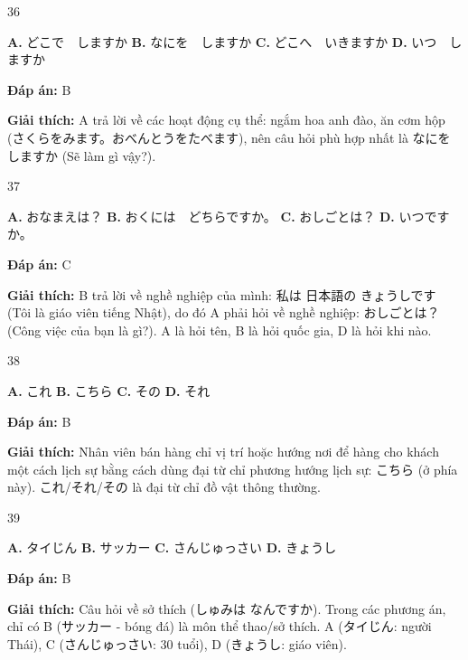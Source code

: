 \documentclass[12pt,a4paper]{report}
\newcommand{\source}[1]{}
\newcommand{\choice}[2]{\textbf{#1.} #2 \quad}
\newcommand{\answer}[1]{\par\textbf{Đáp án:} #1}
\newcommand{\confidence}[1]{}
\newcommand{\explain}[1]{\par\textbf{Giải thích:} #1\vspace{0.5cm}}
\begin{document}
\begin{question}{36}
\source{Q14.jpg}
\choice{A}{どこで　しますか}
\choice{B}{なにを　しますか}
\choice{C}{どこへ　いきますか}
\choice{D}{いつ　しますか}
\answer{B}
\confidence{high}
\explain{A trả lời về các hoạt động cụ thể: ngắm hoa anh đào, ăn cơm hộp (さくらをみます。おべんとうをたべます), nên câu hỏi phù hợp nhất là なにを しますか (Sẽ làm gì vậy?).}
\end{question}

\begin{question}{37}
\source{Q17.jpg}
\choice{A}{おなまえは？}
\choice{B}{おくには　どちらですか。}
\choice{C}{おしごとは？}
\choice{D}{いつですか。}
\answer{C}
\confidence{high}
\explain{B trả lời về nghề nghiệp của mình: 私は 日本語の きょうしです (Tôi là giáo viên tiếng Nhật), do đó A phải hỏi về nghề nghiệp: おしごとは？ (Công việc của bạn là gì?). A là hỏi tên, B là hỏi quốc gia, D là hỏi khi nào.}
\end{question}

\begin{question}{38}
\source{Q19.jpg}
\choice{A}{これ}
\choice{B}{こちら}
\choice{C}{その}
\choice{D}{それ}
\answer{B}
\confidence{high}
\explain{Nhân viên bán hàng chỉ vị trí hoặc hướng nơi để hàng cho khách một cách lịch sự bằng cách dùng đại từ chỉ phương hướng lịch sự: こちら (ở phía này). これ/それ/その là đại từ chỉ đồ vật thông thường.}
\end{question}

\begin{question}{39}
\source{Q20.jpg}
\choice{A}{タイじん}
\choice{B}{サッカー}
\choice{C}{さんじゅっさい}
\choice{D}{きょうし}
\answer{B}
\confidence{high}
\explain{Câu hỏi về sở thích (しゅみは なんですか). Trong các phương án, chỉ có B (サッカー - bóng đá) là môn thể thao/sở thích. A (タイじん: người Thái), C (さんじゅっさい: 30 tuổi), D (きょうし: giáo viên).}
\end{question}
\end{document}
